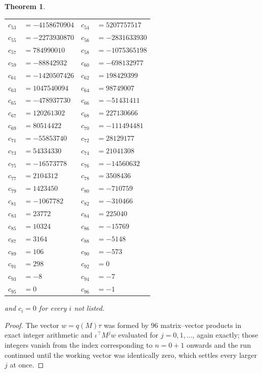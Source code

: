 \documentclass[11pt,a4paper]{article}
\theoremstyle{plain}
\newtheorem{theorem}{Theorem}
\theoremstyle{definition}
\begin{document}
\begin{theorem}
\begin{center}
\begin{tabular}{r@{\,}l@{\qquad}r@{\,}l}
$c_{53}$ & $=-4158670904$ & $c_{54}$ & $=5207757517$ \\
$c_{55}$ & $=-2273930870$ & $c_{56}$ & $=-2831633930$ \\
$c_{57}$ & $=784990010$ & $c_{58}$ & $=-1075365198$ \\
$c_{59}$ & $=-88842932$ & $c_{60}$ & $=-698132977$ \\
$c_{61}$ & $=-1420507426$ & $c_{62}$ & $=198429399$ \\
$c_{63}$ & $=1047540094$ & $c_{64}$ & $=98749007$ \\
$c_{65}$ & $=-478937730$ & $c_{66}$ & $=-51431411$ \\
$c_{67}$ & $=120261302$ & $c_{68}$ & $=227130666$ \\
$c_{69}$ & $=80514422$ & $c_{70}$ & $=-111494481$ \\
$c_{71}$ & $=-55853740$ & $c_{72}$ & $=28129177$ \\
$c_{73}$ & $=54334330$ & $c_{74}$ & $=21041308$ \\
$c_{75}$ & $=-16573778$ & $c_{76}$ & $=-14560632$ \\
$c_{77}$ & $=2104312$ & $c_{78}$ & $=3508436$ \\
$c_{79}$ & $=1423450$ & $c_{80}$ & $=-710759$ \\
$c_{81}$ & $=-1067782$ & $c_{82}$ & $=-310466$ \\
$c_{83}$ & $=23772$ & $c_{84}$ & $=225040$ \\
$c_{85}$ & $=10324$ & $c_{86}$ & $=-15769$ \\
$c_{87}$ & $=3164$ & $c_{88}$ & $=-5148$ \\
$c_{89}$ & $=106$ & $c_{90}$ & $=-573$ \\
$c_{91}$ & $=298$ & $c_{92}$ & $=0$ \\
$c_{93}$ & $=-8$ & $c_{94}$ & $=-7$ \\
$c_{95}$ & $=0$ & $c_{96}$ & $=-1$ \\
\end{tabular}
\end{center}
and $c_i=0$ for every $i$ not listed.
\end{theorem}

\begin{proof}
The vector $w=q(M)\tau$ was formed by $96$ matrix--vector products in exact integer
arithmetic and $\iota^{\!\top}M^{j}w$ evaluated for $j=0,1,\dots$, again exactly; those
integers vanish from the index corresponding to $n=0+1$ onwards and the run continued
until the working vector was identically zero, which settles every larger $j$ at once.
\end{proof}
\end{document}
